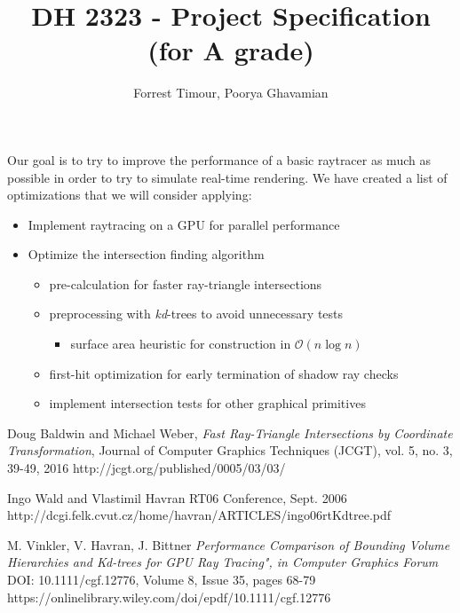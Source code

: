 \documentclass{article}
\title{DH 2323 - Project Specification (for A grade)}
\author{Forrest Timour, Poorya Ghavamian}
\begin{document}
\maketitle

Our goal is to try to improve the performance of a basic raytracer as much as possible in order to try to simulate real-time rendering. We have created a list of optimizations that we will consider applying:

\begin{itemize}
\item Implement raytracing on a GPU for parallel performance
\item Optimize the intersection finding algorithm
    \begin{itemize}
    \item pre-calculation for faster ray-triangle intersections \cite{ray-triangle}
    \item preprocessing with \emph{kd}-trees to avoid unnecessary tests\cite{kd-nlogn}\cite{kd-bvh}
    \begin{itemize}
        \item surface area heuristic for construction in $\mathcal{O}(n\log n)$
    \end{itemize}
    \item first-hit optimization for early termination of shadow ray checks
    \item implement intersection tests for other graphical primitives
    \end{itemize}
\end{itemize}

\begin{thebibliography}{999}
Doug Baldwin and Michael Weber,
\emph{Fast Ray-Triangle Intersections by Coordinate Transformation},
Journal of Computer Graphics Techniques (JCGT), vol. 5, no. 3, 39-49, 2016
http://jcgt.org/published/0005/03/03/

Ingo Wald and Vlastimil Havran
RT06 Conference, Sept. 2006\\
http://dcgi.felk.cvut.cz/home/havran/ARTICLES/ingo06rtKdtree.pdf

M. Vinkler, V. Havran, J. Bittner
\emph{Performance Comparison of Bounding Volume Hierarchies and Kd-trees for GPU Ray Tracing", in Computer Graphics Forum}
DOI: 10.1111/cgf.12776, Volume 8, Issue 35, pages 68-79
https://onlinelibrary.wiley.com/doi/epdf/10.1111/cgf.12776

\end{thebibliography}
\end{document}
